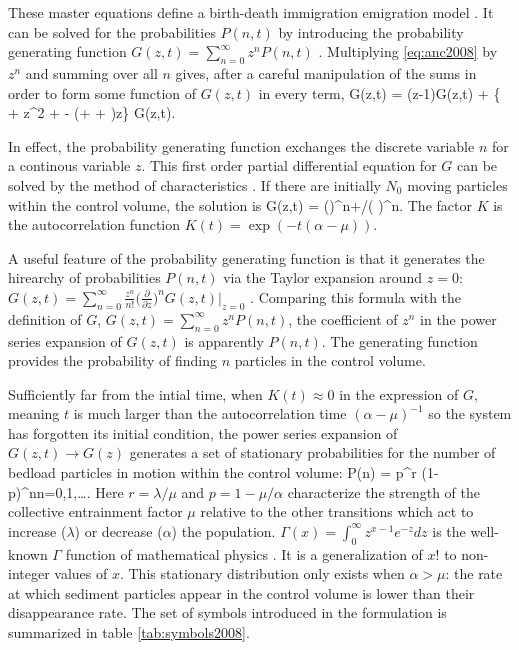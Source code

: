 These master equations define a birth-death immigration emigration model \citep[e.g.][]{Cox1965, Gardiner1983}. 
It can be solved for the probabilities $P(n,t)$ by introducing the probability generating function $G(z,t) = \sum_{n=0}^\infty z^n P(n,t)$ \citep{Cox1965, Gardiner1983, Ancey2008}. 
Multiplying \ref{eq:anc2008} by $z^n$ and summing over all $n$ gives, after a careful manipulation of the sums in order to form some function of $G(z,t)$ in every term, 
\be {} G(z,t) = \lambda(z-1)G(z,t) + \{ \sigma + \mu z^2 + \nu - (\mu + \sigma + \nu)z\}  G(z,t). \ee

In effect, the probability generating function exchanges the discrete variable $n$ for a continous variable $z$. 
This first order partial differential equation for $G$ can be solved by the method of characteristics \citep{Cox1965, Garabedian1964}. 
If there are initially $N_0$ moving particles within the control volume, the solution is 
\be G(z,t) = \Big(\Big)^{n+\lambda/\mu}\Big( \Big)^n. \label{eq:generator}\ee
The factor $K$ is the autocorrelation function $K(t) = \exp(-t(\alpha-\mu)).$

A useful feature of the probability generating function is that it generates the hirearchy of probabilities $P(n,t)$ via the Taylor expansion around $z=0$: $G(z,t) = \sum_{n=0}^\infty \frac{z^n}{n!}\big(\frac{\partial}{\partial z}\big)^n G(z,t) |_{z=0}$ \citep{Cox1965}. Comparing this formula with the definition of $G$, $G(z,t) = \sum_{n=0}^\infty z^n P(n,t)$, the coefficient of $z^n$ in the power series expansion of $G(z,t)$ is  apparently $P(n,t)$. 
The generating function provides the probability of finding $n$ particles in the control volume. 

Sufficiently far from the intial time, when $K(t) \approx 0 $ in the expression of $G$, meaning $t$ is much larger than the autocorrelation time $(\alpha-\mu)^{-1}$ so the system has forgotten its initial condition, the power series expansion of $G(z,t) \rightarrow G(z)$ generates a set of stationary probabilities for the number of bedload particles in motion within the control volume: 
\be P(n) =  p^r (1-p)^n\text{, }n=0,1,\dots. \label{eq:negbin0}\ee
Here $r=\lambda/\mu$ and $p = 1-\mu/\alpha$ characterize the strength of the collective entrainment factor $\mu$ relative to the other transitions which act to increase ($\lambda$) or decrease ($\alpha$) the population.  
$\Gamma(x) = \int_0^\infty z ^{x-1} e^{-z} dz$ is the well-known $\Gamma$ function of mathematical physics \citep{Boas2005, Mathews1971}. It is a generalization of $x!$ to non-integer values of $x$. 
This stationary distribution only exists when $\alpha>\mu$: the rate at which sediment particles appear in the control volume is lower than their disappearance rate. 
The set of symbols introduced in the \citet{Ancey2008} formulation is summarized in table \ref{tab:symbols2008}. 


